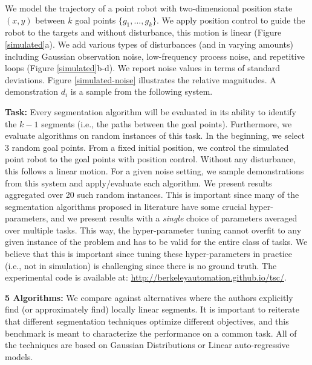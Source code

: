 We model the trajectory of a point robot with two-dimensional position state $(x,y)$ between $k$ goal points $\{g_1,...,g_k\}$. 
We apply position control to guide the robot to the targets and without disturbance, this motion is linear (Figure \ref{simulated}a).
We add various types of disturbances (and in varying amounts) including Gaussian observation noise, low-frequency process noise, and repetitive loops (Figure \ref{simulated}b-d).
We report noise values in terms of standard deviations. Figure \ref{simulated-noise} illustrates the relative magnitudes.
A demonstration $d_i$ is a sample from the following system.

\vspace{0.5em}
\noindent\textbf{Task: } Every segmentation algorithm will be evaluated in its ability to identify the $k-1$ segments (i.e., the paths between the goal points).
Furthermore, we evaluate algorithms on random instances of this task.
In the beginning, we select $3$ random goal points.
From a fixed initial position, we control the simulated point robot to the goal points with position control. 
Without any disturbance, this follows a linear motion.
For a given noise setting, we sample demonstrations from this system and apply/evaluate each algorithm.
We present results aggregated over 20 such random instances.
This is important since many of the segmentation algorithms proposed in literature have some crucial hyper-parameters, and we present results with a \emph{single} choice of parameters averaged over multiple tasks.
This way, the hyper-parameter tuning cannot overfit to any given instance of the problem and has to be valid for the entire class of tasks.
We believe that this is important since tuning these hyper-parameters in practice (i.e., not in simulation) is challenging since there is no ground truth. 
The experimental code is available at: \url{http://berkeleyautomation.github.io/tsc/}.

\vspace{0.5em}
\noindent\textbf{5 Algorithms: } We compare \tsc against alternatives where the authors explicitly find (or approximately find) locally linear segments. It is important to reiterate that different segmentation techniques optimize different objectives, and this benchmark is meant to characterize the performance on a common task. All of the techniques are based on Gaussian Distributions or Linear auto-regressive models.

